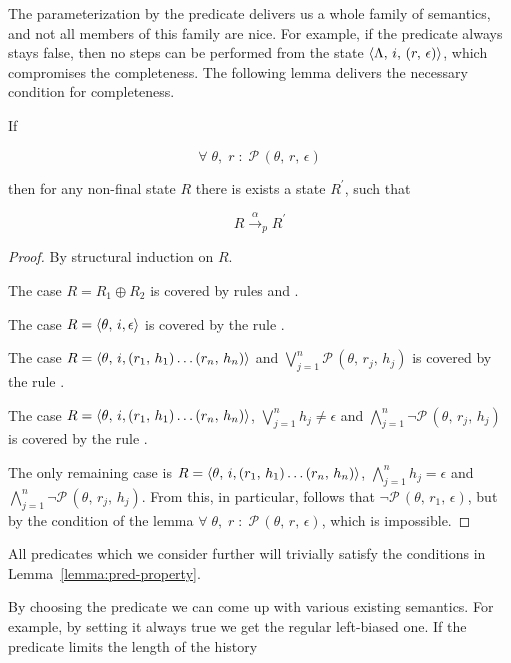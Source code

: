 The parameterization by the predicate delivers us a whole family of semantics, and not all members of this family are nice. For example,
if the predicate always stays false, then no steps can be performed from the state $\langle \Lambda,\, i, \, (r,\, \epsilon) \rangle$, which compromises the completeness.
The following lemma delivers the necessary condition for completeness.

\begin{lemma}
\label{lemma:pred-property}
If

\[
\forall\;\theta,\;r\; :\;\mathcal{P}\,(\theta,\, r,\, \epsilon)
\]

then for any non-final state $R$ there is exists a state $R^\prime$, such that

\[
R \xrightarrow{\alpha}_p R^\prime
\]
\end{lemma}
\begin{proof}
  By structural induction on $R$.

  The case \mbox{$R = R_1 \oplus R_2$} is covered by rules  and .

  The case $R = \langle \theta,\, i, \epsilon \rangle$ is  covered by the rule .

  The case \mbox{$R = \langle \theta,\, i, (r_1,\,h_1) \dots (r_n,\,h_n) \rangle$} and $\bigvee_{j=1}^n \mathcal{P}\,(\theta,\, r_j,\, h_j)$ is covered by the
  rule .

  The case $R = \langle \theta,\, i, (r_1,\,h_1) \ldots (r_n,\,h_n) \rangle$,  $\bigvee_{j=1}^n h_j \not= \epsilon$ and $\bigwedge_{j=1}^n \neg\mathcal{P}\,(\theta,\,r_j,\,h_j)$
  is covered by the rule .

  The only remaining case is $R = \langle \theta,\, i, (r_1,\,h_1) \ldots (r_n,\,h_n) \rangle$, $\bigwedge_{j=1}^n h_j= \epsilon$ and
  $\bigwedge_{j=1}^n \neg\mathcal{P}\,(\theta,\,r_j,\,h_j)$. From this, in particular, follows that $\neg\mathcal{P}\,(\theta,\,r_1,\,\epsilon)$, but by the condition of the lemma
  $\forall\;\theta,\;r\; :\;\mathcal{P}\,(\theta,\, r,\, \epsilon)$, which is impossible.
\end{proof}

All predicates which we consider further will trivially satisfy the conditions in Lemma~\ref{lemma:pred-property}.

By choosing the predicate we can come up with various existing semantics. For example, by setting it always true we get the regular left-biased one.
If the predicate limits the length of the history


